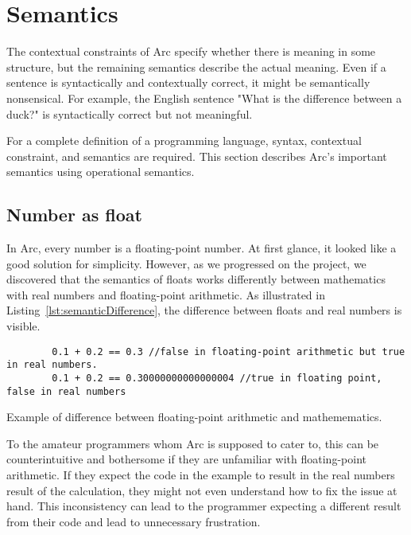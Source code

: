 \section{Semantics}\label{sec:languagesemantics}
The contextual constraints of Arc specify whether there is meaning in some structure, but the remaining semantics describe the actual meaning. Even if a sentence is syntactically and contextually correct, it might be semantically nonsensical. For example, the English sentence "What is the difference between a duck?" is syntactically correct but not meaningful.

For a complete definition of a programming language, syntax, contextual constraint, and semantics are required. This section describes Arc's important semantics using operational semantics.


\subsection{Number as float}\label{subsec:numberAsFloats}
In Arc, every number is a floating-point number. At first glance, it looked like a good solution for simplicity. However, as we progressed on the project, we discovered that the semantics of floats works differently between mathematics with real numbers and floating-point arithmetic. As illustrated in Listing~\ref{lst:semanticDifference}, the difference between floats and real numbers is visible.


\begin{listing}[htb!]
    \begin{verbatim}
        0.1 + 0.2 == 0.3 //false in floating-point arithmetic but true in real numbers.
        0.1 + 0.2 == 0.30000000000000004 //true in floating point, false in real numbers
    \end{verbatim}
    \caption{Example of difference between floating-point arithmetic and mathemematics.}
    \label{lst:semanticDifference}
\end{listing}


To the amateur programmers whom Arc is supposed to cater to, this can be counterintuitive and bothersome if they are unfamiliar with floating-point arithmetic. If they expect the code in the example to result in the real numbers result of the calculation, they might not even understand how to fix the issue at hand. This inconsistency can lead to the programmer expecting a different result from their code and lead to unnecessary frustration.

